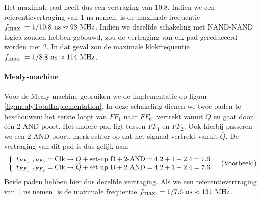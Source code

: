 Het maximale pad heeft dus een vertraging van $10.8$. Indien we een referentievertraging van $1\mbox{ ns}$ nemen, is de maximale frequentie $f_{\mbox{\small{max.}}}=1/10.8\mbox{ ns}\approx 93\mbox{ MHz}$. Indien we dezelfde schakeling met NAND-NAND logica zouden hebben gebouwd, zou de vertraging van elk pad gereduceerd worden met 2. In dat geval zou de maximale klokfrequentie $f_{\mbox{\small{max.}}}=1/8.8\mbox{ ns}\approx 114\mbox{ MHz}$.
\paragraph{Mealy-machine}
Voor de Mealy-machine gebruiken we de implementatie op figuur \ref{fig:mealyTotalImplementation}. In deze schakeling dienen we twee paden te beschouwen: het eerste loopt van $FF_1$ naar $FF_0$, vertrekt vanuit $Q$ en gaat door \'e\'en 2-AND-poort. Het andere pad ligt tussen $FF_1$ en $FF_2$. Ook hierbij passeren we een 2-AND-poort, merk echter op dat het signaal vertrekt vanuit $\overline{Q}$. De vertraging van dit pad is dus gelijk aan:
\begin{equation}
\begin{array}{ll}
\left\{\begin{array}{l}
t_{\small{FF_1\rightarrow FF_0}}=\mbox{Clk}\rightarrow Q+\mbox{set-up D}+\mbox{2-AND}=4.2+1+2.4=7.6\\
t_{\small{FF_1\rightarrow FF_2}}=\mbox{Clk}\rightarrow \overline{Q}+\mbox{set-up D}+\mbox{2-AND}=4.2+1+2.4=7.6
\end{array}\right.&\mbox{(Voorbeeld)}
\end{array}
\end{equation}
Beide paden hebben hier dus dezelfde vertraging. Als we een referentievertraging van $1\mbox{ ns}$ nemen, is de maximale frequentie $f_{\mbox{\small{max.}}}=1/7.6\mbox{ ns}\approx 131\mbox{ MHz}$.

